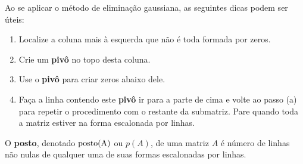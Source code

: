 \documentclass{beamer}
\begin{document}
    \begin{frame}
        \begin{observacao}
            Ao se aplicar o método de eliminação gaussiana, as seguintes dicas podem ser úteis:\pause
            \begin{enumerate}[label=({\alph*})]
                \item Localize a coluna mais à esquerda que não é toda formada por zeros.\pause

                \vspace{.3cm}

                \item Crie um \textbf{pivô} no topo desta coluna.\pause

                \vspace{.3cm}

                \item Use o \textbf{pivô} para criar zeros abaixo dele.\pause

                \vspace{.3cm}

                \item Faça a linha contendo este \textbf{pivô} ir para a parte de cima \pause e volte ao passo (a) para repetir o procedimento com o restante da submatriz. \pause Pare quando toda a matriz estiver na forma escalonada por linhas.
            \end{enumerate}
        \end{observacao}
    \end{frame}

    \begin{frame}
        \begin{definicao}
            O \textbf{posto}, \pause denotado $\mbox{\textrm{posto(A)}}$ \pause ou $p(A)$, \pause de uma matriz $A$ \pause é número de linhas não nulas \pause de qualquer uma de suas formas escalonadas por linhas.
        \end{definicao}
    \end{frame}
\end{document}
